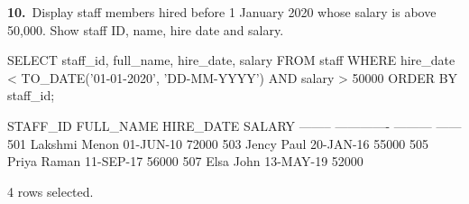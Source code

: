 \noindent\begin{minipage}{\linewidth}
\begingroup{}
{\fontsize{14}{17}\selectfont\textbf{10.}}\ Display staff members hired before 1 January 2020 whose salary is above 50,000. Show staff ID, name, hire date and salary.\par
\endgroup\vspace{12pt}


\begin{sqlcode}
SELECT staff_id, full_name, hire_date, salary
FROM staff
WHERE hire_date < TO_DATE('01-01-2020', 'DD-MM-YYYY')
  AND salary > 50000
ORDER BY staff_id;
\end{sqlcode}

\vspace{18pt}


\begin{sqlout}[fontsize=\small]
STAFF_ID  FULL_NAME      HIRE_DATE  SALARY
--------  -------------  ---------  ------
     501  Lakshmi Menon  01-JUN-10   72000
     503  Jency Paul     20-JAN-16   55000
     505  Priya Raman    11-SEP-17   56000
     507  Elsa John      13-MAY-19   52000

4 rows selected.
\end{sqlout}
\end{minipage}\par\vspace{24pt}

